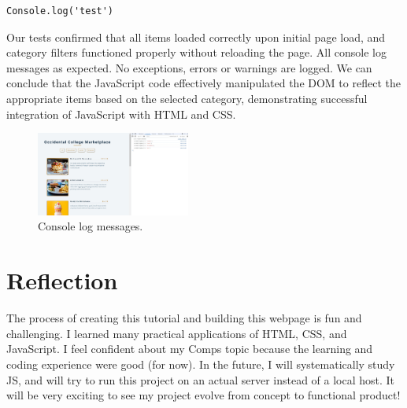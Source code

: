 \documentclass[10pt,twocolumn]{article}
\begin{document}
\begin{lstlisting}
Console.log('test')
\end{lstlisting}



Our tests confirmed that all items loaded correctly upon initial page load, and category filters functioned properly without reloading the page. All console log messages as expected. No exceptions, errors or warnings are logged. We can conclude that the JavaScript code effectively manipulated the DOM to reflect the appropriate items based on the selected category, demonstrating successful integration of JavaScript with HTML and CSS.

  \begin{figure}[h]
  \centering
  \includegraphics[width=0.45\textwidth]{Console.jpg}
  \caption{Console log messages.}
  \label{fig:image1}
\end{figure}

\section{Reflection}
The process of creating this tutorial and building this webpage is fun and challenging. I learned many practical applications of HTML, CSS, and JavaScript. I feel confident about my Comps topic because the learning and coding experience were good (for now). In the future, I will systematically study JS, and will try to run this project on an actual server instead of a local host. It will be very exciting to see my project evolve from concept to functional product!
\end{document}
